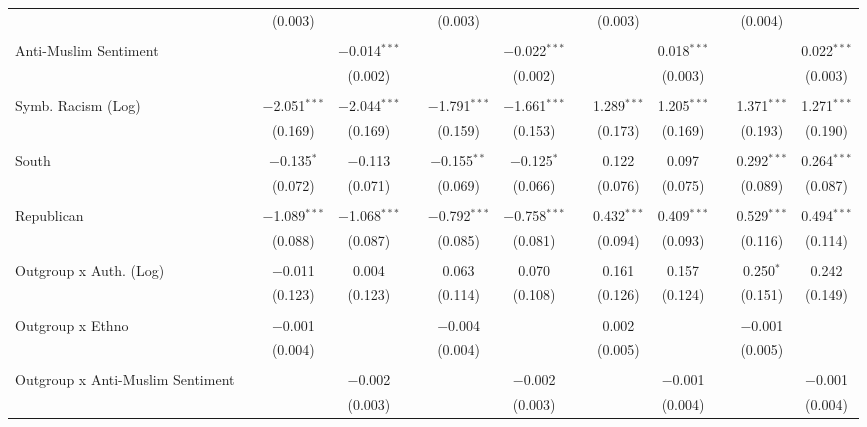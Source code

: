 \begin{table}[H]
{\begin{tabular}{@{\extracolsep{5pt}}lcccccccccccc}
  &  & (0.003) &  &  & (0.003) &  &  & (0.003) &  &  & (0.004) &  \\ 
  & & & & & & & & & & & & \\ 
 Anti-Muslim Sentiment &  &  & $-$0.014$^{***}$ &  &  & $-$0.022$^{***}$ &  &  & 0.018$^{***}$ &  &  & 0.022$^{***}$ \\ 
  &  &  & (0.002) &  &  & (0.002) &  &  & (0.003) &  &  & (0.003) \\ 
  & & & & & & & & & & & & \\ 
 Symb. Racism (Log) &  & $-$2.051$^{***}$ & $-$2.044$^{***}$ &  & $-$1.791$^{***}$ & $-$1.661$^{***}$ &  & 1.289$^{***}$ & 1.205$^{***}$ &  & 1.371$^{***}$ & 1.271$^{***}$ \\ 
  &  & (0.169) & (0.169) &  & (0.159) & (0.153) &  & (0.173) & (0.169) &  & (0.193) & (0.190) \\ 
  & & & & & & & & & & & & \\ 
 South &  & $-$0.135$^{*}$ & $-$0.113 &  & $-$0.155$^{**}$ & $-$0.125$^{*}$ &  & 0.122 & 0.097 &  & 0.292$^{***}$ & 0.264$^{***}$ \\ 
  &  & (0.072) & (0.071) &  & (0.069) & (0.066) &  & (0.076) & (0.075) &  & (0.089) & (0.087) \\ 
  & & & & & & & & & & & & \\ 
 Republican &  & $-$1.089$^{***}$ & $-$1.068$^{***}$ &  & $-$0.792$^{***}$ & $-$0.758$^{***}$ &  & 0.432$^{***}$ & 0.409$^{***}$ &  & 0.529$^{***}$ & 0.494$^{***}$ \\ 
  &  & (0.088) & (0.087) &  & (0.085) & (0.081) &  & (0.094) & (0.093) &  & (0.116) & (0.114) \\ 
  & & & & & & & & & & & & \\ 
 Outgroup x Auth. (Log) &  & $-$0.011 & 0.004 &  & 0.063 & 0.070 &  & 0.161 & 0.157 &  & 0.250$^{*}$ & 0.242 \\ 
  &  & (0.123) & (0.123) &  & (0.114) & (0.108) &  & (0.126) & (0.124) &  & (0.151) & (0.149) \\ 
  & & & & & & & & & & & & \\ 
 Outgroup x Ethno &  & $-$0.001 &  &  & $-$0.004 &  &  & 0.002 &  &  & $-$0.001 &  \\ 
  &  & (0.004) &  &  & (0.004) &  &  & (0.005) &  &  & (0.005) &  \\ 
  & & & & & & & & & & & & \\ 
 Outgroup x Anti-Muslim Sentiment &  &  & $-$0.002 &  &  & $-$0.002 &  &  & $-$0.001 &  &  & $-$0.001 \\ 
  &  &  & (0.003) &  &  & (0.003) &  &  & (0.004) &  &  & (0.004) \\ 

\end{tabular}}
\end{table}
